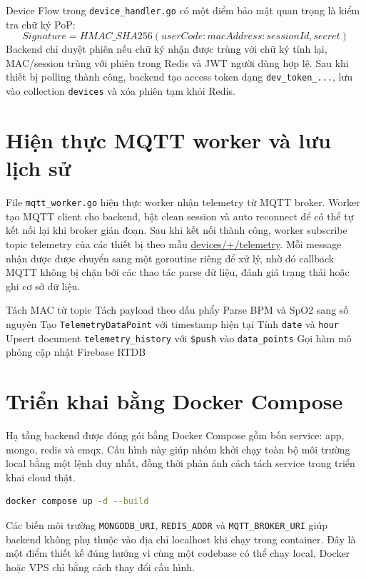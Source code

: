\documentclass[a4paper,13pt,3p,oneside]{report}
\begin{document}
Device Flow trong \texttt{device\_handler.go} có một điểm bảo mật quan trọng là kiểm tra chữ ký PoP:
\begin{equation}
Signature = HMAC\_SHA256(userCode : macAddress : sessionId, secret)
\end{equation}
Backend chỉ duyệt phiên nếu chữ ký nhận được trùng với chữ ký tính lại, MAC/session trùng với phiên trong Redis và JWT người dùng hợp lệ. Sau khi thiết bị polling thành công, backend tạo access token dạng \texttt{dev\_token\_...}, lưu vào collection \texttt{devices} và xóa phiên tạm khỏi Redis.

\section{Hiện thực MQTT worker và lưu lịch sử}
File \texttt{mqtt\_worker.go} hiện thực worker nhận telemetry từ MQTT broker. Worker tạo MQTT client cho backend, bật clean session và auto reconnect để có thể tự kết nối lại khi broker gián đoạn. Sau khi kết nối thành công, worker subscribe topic telemetry của các thiết bị theo mẫu \url{devices/+/telemetry}. Mỗi message nhận được được chuyển sang một goroutine riêng để xử lý, nhờ đó callback MQTT không bị chặn bởi các thao tác parse dữ liệu, đánh giá trạng thái hoặc ghi cơ sở dữ liệu.

\begin{algorithm}[H]
\caption{Thuật toán xử lý telemetry trong MQTT worker}
Tách MAC từ topic\;
Tách payload theo dấu phẩy\;
Parse BPM và SpO2 sang số nguyên\;
Tạo \texttt{TelemetryDataPoint} với timestamp hiện tại\;
Tính \texttt{date} và \texttt{hour}\;
Upsert document \texttt{telemetry\_history} với \texttt{\$push} vào \texttt{data\_points}\;
Gọi hàm mô phỏng cập nhật Firebase RTDB\;
\end{algorithm}

\section{Triển khai bằng Docker Compose}
Hạ tầng backend được đóng gói bằng Docker Compose gồm bốn service: app, mongo, redis và emqx. Cấu hình này giúp nhóm khởi chạy toàn bộ môi trường local bằng một lệnh duy nhất, đồng thời phản ánh cách tách service trong triển khai cloud thật.
\begin{lstlisting}[language=bash]
docker compose up -d --build
\end{lstlisting}
Các biến môi trường \texttt{MONGODB\_URI}, \texttt{REDIS\_ADDR} và \texttt{MQTT\_BROKER\_URI} giúp backend không phụ thuộc vào địa chỉ localhost khi chạy trong container. Đây là một điểm thiết kế đúng hướng vì cùng một codebase có thể chạy local, Docker hoặc VPS chỉ bằng cách thay đổi cấu hình.
\end{document}
